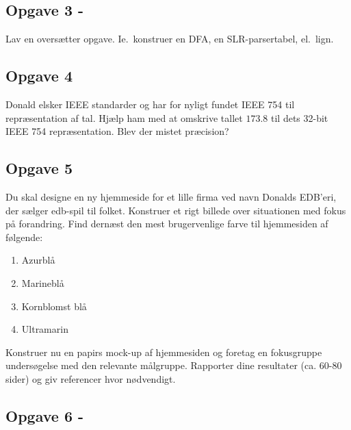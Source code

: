 \subsection{Opgave 3 - \color{red}{TODO!}}

Lav en oversætter opgave. Ie.~konstruer en DFA, en SLR-parsertabel, el.~lign.

%


\subsection{Opgave 4}
Donald elsker IEEE standarder og har for nyligt fundet IEEE 754 til
repræsentation af tal. Hjælp ham med at omskrive tallet $173.8$ til dets
32-bit IEEE 754 repræsentation. Blev der mistet præcision?


\subsection{Opgave 5}
Du skal designe en ny hjemmeside for et lille firma ved navn Donalds EDB'eri,
der sælger edb-spil til folket. Konstruer et rigt billede over situationen med
fokus på forandring. Find dernæst den mest brugervenlige farve til hjemmesiden
af følgende:
\begin{enumerate}
    \item Azurblå
    \item Marineblå
    \item Kornblomst blå
    \item Ultramarin
\end{enumerate}
Konstruer nu en papirs mock-up af hjemmesiden og foretag en fokusgruppe
undersøgelse med den relevante målgruppe. Rapporter dine resultater (ca.
60-80 sider) og giv referencer hvor nødvendigt.


\subsection{Opgave 6 - \color{red}{TODO!}}

